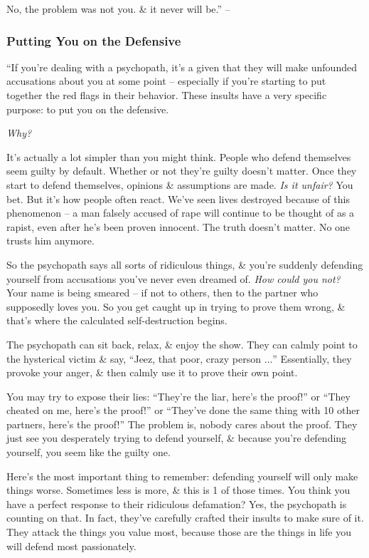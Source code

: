 \documentclass{article}
\numberwithin{equation}{section}
\begin{document}
No, the problem was not you. \& it never will be.'' -- \cite[pp. 50--54]{MacKenzie2015}

\subsubsection{Putting You on the Defensive}
``If you're dealing with a psychopath, it's a given that they will make unfounded accusations about you at some point -- especially if you're starting to put together the red flags in their behavior. These insults have a very specific purpose: to put you on the defensive.

\textit{Why?}

It's actually a lot simpler than you might think. People who defend themselves seem guilty by default. Whether or not they're guilty doesn't matter. Once they start to defend themselves, opinions \& assumptions are made. \textit{Is it unfair?} You bet. But it's how people often react. We've seen lives destroyed because of this phenomenon -- a man falsely accused of rape will continue to be thought of as a rapist, even after he's been proven innocent. The truth doesn't matter. No one trusts him anymore.

So the psychopath says all sorts of ridiculous things, \& you're suddenly defending yourself from accusations you've never even dreamed of. \textit{How could you not?} Your name is being smeared -- if not to others, then to the partner who supposedly loves you. So you get caught up in trying to prove them wrong, \& that's where the calculated self-destruction begins.

The psychopath can sit back, relax, \& enjoy the show. They can calmly point to the hysterical victim \& say, ``Jeez, that poor, crazy person $\ldots$'' Essentially, they provoke your anger, \& then calmly use it to prove their own point.

You may try to expose their lies: ``They're the liar, here's the proof!'' or ``They cheated on me, here's the proof!'' or ``They've done the same thing with 10 other partners, here's the proof!'' The problem is, nobody cares about the proof. They just see you desperately trying to defend yourself, \& because you're defending yourself, you seem like the guilty one.

Here's the most important thing to remember: defending yourself will only make things worse. Sometimes less is more, \& this is 1 of those times. You think you have a perfect response to their ridiculous defamation? Yes, the psychopath is counting on that. In fact, they've carefully crafted their insults to make sure of it. They attack the things you value most, because those are the things in life you will defend most passionately.
\end{document}
